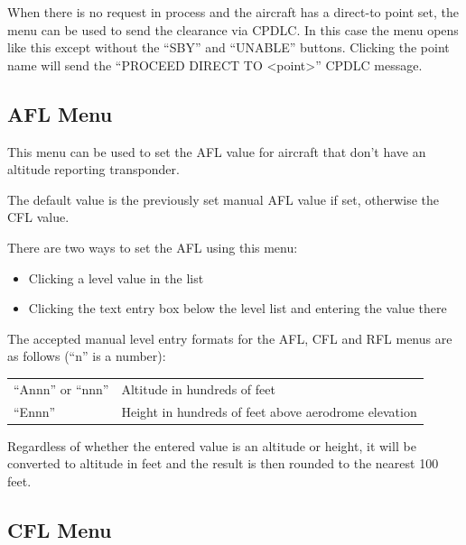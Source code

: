 \documentclass[a4paper,oneside,11pt]{memoir}
\begin{document}
When there is no request in process and the aircraft has a direct-to point set, the menu can be used to send the clearance via CPDLC. In this case the menu opens like this except without the “SBY” and “UNABLE” buttons. Clicking the point name will send the “PROCEED DIRECT TO <point>” CPDLC message.

\subsection{AFL Menu}
\label{menu:afl}


This menu can be used to set the AFL value for aircraft that don’t have an altitude reporting transponder.

\bigskip

The default value is the previously set manual AFL value if set, otherwise the CFL value.

\bigskip

There are two ways to set the AFL using this menu:

\begin{itemize}
        \item Clicking a level value in the list
        \item Clicking the text entry box below the level list and entering the value there
\end{itemize}

The accepted manual level entry formats for the AFL, CFL and RFL menus are as follows (“n” is a number):

\bigskip

\begin{longtable}{p{5cm} p{7.5cm}}
“Annn” or “nnn”         & Altitude in hundreds of feet\\
“Ennn”                  & Height in hundreds of feet above aerodrome elevation\\
\end{longtable}    

\bigskip

Regardless of whether the entered value is an altitude or height, it will be converted to altitude in feet and the result is then rounded to the nearest 100 feet.

\subsection{CFL Menu}
\label{menu:cfl}
\end{document}
